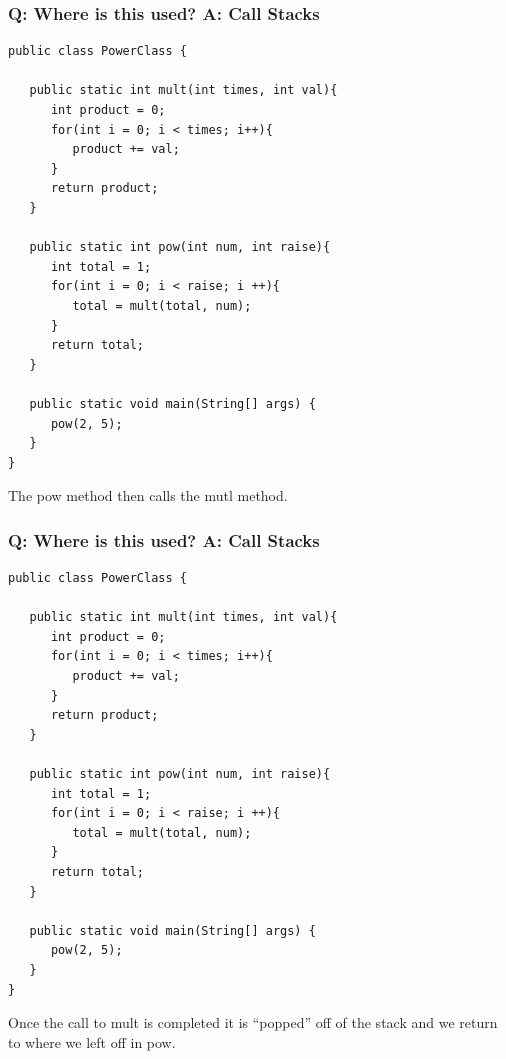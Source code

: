 \documentclass{beamer}
\begin{document}
\begin{frame}[fragile]
    \frametitle{Q: Where is this used? A: Call Stacks}
    \begin{minipage}{0.54\textwidth}
    \begin{lstlisting}[frame=trBL, basicstyle=\tiny]
public class PowerClass {
   
   public static int mult(int times, int val){
      int product = 0;
      for(int i = 0; i < times; i++){
         product += val;
      }
      return product;
   }
   
   public static int pow(int num, int raise){
      int total = 1;
      for(int i = 0; i < raise; i ++){
         total = mult(total, num);
      }
      return total;
   }
   
   public static void main(String[] args) {
      pow(2, 5);
   }
}
    \end{lstlisting}
    \end{minipage}
	\hfill
    \begin{minipage}{0.44\textwidth}
        \begin{drawstack}
        \end{drawstack}
    \end{minipage}
    \centering 
    The pow method then calls the mutl method.
\end{frame}

\begin{frame}[fragile]
    \frametitle{Q: Where is this used? A: Call Stacks}
    \begin{minipage}{0.54\textwidth}
    \begin{lstlisting}[frame=trBL, basicstyle=\tiny]
public class PowerClass {
   
   public static int mult(int times, int val){
      int product = 0;
      for(int i = 0; i < times; i++){
         product += val;
      }
      return product;
   }
   
   public static int pow(int num, int raise){
      int total = 1;
      for(int i = 0; i < raise; i ++){
         total = mult(total, num);
      }
      return total;
   }
   
   public static void main(String[] args) {
      pow(2, 5);
   }
}
    \end{lstlisting}
    \end{minipage}
	\hfill
    \begin{minipage}{0.44\textwidth}
        \begin{drawstack}
        \end{drawstack}
    \end{minipage}
    \centering 
    Once the call to mult is completed it is ``popped'' off of the stack and we return to where we left off in pow.
\end{frame}
\end{document}
